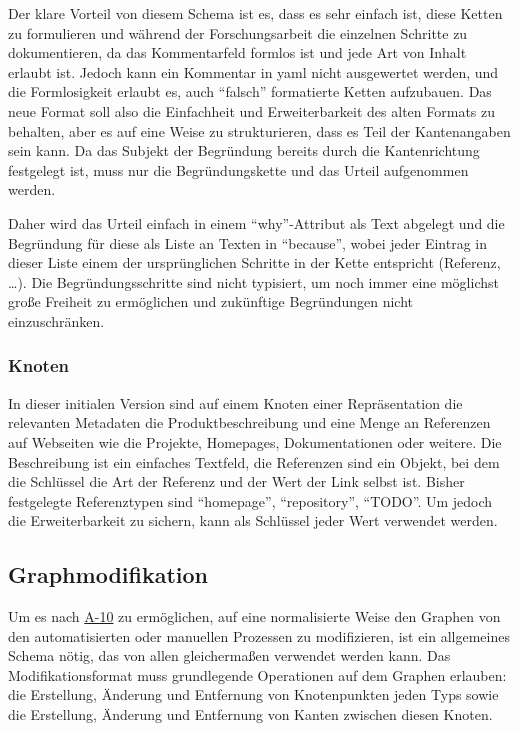 Der klare Vorteil von diesem Schema ist es, dass es sehr einfach ist, diese Ketten zu formulieren und während der Forschungsarbeit die einzelnen Schritte zu dokumentieren, da das Kommentarfeld formlos ist und jede Art von Inhalt erlaubt ist.
Jedoch kann ein Kommentar in \acrshort{yaml} nicht ausgewertet werden, und die Formlosigkeit erlaubt es, auch \enquote{falsch} formatierte Ketten aufzubauen.
Das neue Format soll also die Einfachheit und Erweiterbarkeit des alten Formats zu behalten, aber es auf eine Weise zu strukturieren, dass es Teil der Kantenangaben sein kann.
Da das Subjekt der Begründung bereits durch die Kantenrichtung festgelegt ist, muss nur die Begründungskette und das Urteil aufgenommen werden.

Daher wird das Urteil einfach in einem \enquote{why}-Attribut als Text abgelegt und die Begründung für diese als Liste an Texten in \enquote{because}, wobei jeder Eintrag in dieser Liste einem der ursprünglichen Schritte in der Kette entspricht (Referenz, \ldots).
Die Begründungsschritte sind nicht typisiert, um noch immer eine möglichst große Freiheit zu ermöglichen und zukünftige Begründungen nicht einzuschränken.

\subsubsection{Knoten}

In dieser initialen Version sind auf einem Knoten einer Repräsentation die relevanten Metadaten die Produktbeschreibung und eine Menge an Referenzen auf Webseiten wie die Projekte, Homepages, Dokumentationen oder weitere.
Die Beschreibung ist ein einfaches Textfeld, die Referenzen sind ein Objekt, bei dem die Schlüssel die Art der Referenz und der Wert der Link selbst ist.
Bisher festgelegte Referenztypen sind \enquote{homepage}, \enquote{repository}, \enquote{TODO}. %
Um jedoch die Erweiterbarkeit zu sichern, kann als Schlüssel jeder Wert verwendet werden.

\subsection{Graphmodifikation}\label{subsec:model-graph-modification}

Um es nach \hyperref[subsec:req-manual-format-modification]{A-10} zu ermöglichen, auf eine normalisierte Weise den Graphen von den automatisierten oder manuellen Prozessen zu modifizieren, ist ein allgemeines Schema nötig, das von allen gleichermaßen verwendet werden kann.
Das Modifikationsformat muss grundlegende Operationen auf dem Graphen erlauben: die Erstellung, Änderung und Entfernung von Knotenpunkten jeden Typs sowie die Erstellung, Änderung und Entfernung von Kanten zwischen diesen Knoten.

